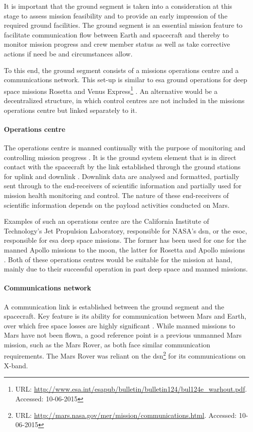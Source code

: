 It is important that the ground segment is taken into a consideration at this stage to assess mission feasibility and to provide an early impression of the required ground facilities. The ground segment is an essential mission feature to facilitate communication flow between Earth and spacecraft and thereby to monitor mission progress and crew member status as well as take corrective actions if need be and circumstances allow.

To this end, the ground segment consists of a missions operations centre and a communications network. This set-up is similar to \gls{esa} ground operations for deep space missions Rosetta and Venus Express\footnote{URL: \url{http://www.esa.int/esapub/bulletin/bulletin124/bul124e_warhout.pdf}. Accessed: 10-06-2015}  \cite{Warhaut2007}. An alternative would be a decentralized structure, in which control centres are not included in the missions operations centre but linked separately to it. 

\paragraph{Operations centre}
The operations centre is manned continually with the purpose of monitoring and controlling mission progress \cite{Warhaut2007}. It is the ground system element that is in direct contact with the spacecraft by the link established through the ground stations for uplink and downlink \cite[p.879]{Wertz2011}. Downlink data are analysed and formatted, partially sent through to the end-receivers of scientific information and partially used for mission health monitoring and control. The nature of these end-receivers of scientific information depends on the payload activities conducted on Mars. 

Examples of such an operations centre are the California Institute of Technology's Jet Propulsion Laboratory, responsible for NASA's \gls{dsn}, or the \gls{esoc}, responsible for \gls{esa} deep space missions. The former has been used for one for the manned Apollo missions to the moon, the latter for Rosetta and Apollo missions \cite{Wertz2011,Warhaut2007}. Both of these operations centres would be suitable for the mission at hand, mainly due to their successful operation in past deep space and manned missions. 

\paragraph{Communications network}
A communication link is established between the ground segment and the spacecraft. Key feature is its ability for communication between Mars and Earth, over which free space losses are highly significant \cite{Wertz2011}. While manned missions to Mars have not been flown, a good reference point is a previous unmanned Mars mission, such as the Mars Rover, as both face similar communication requirements. The Mars Rover was reliant on the \gls{dsn}\footnote{URL: \url{http://mars.nasa.gov/mer/mission/communications.html}. Accessed: 10-06-2015} for its communications on X-band. 

